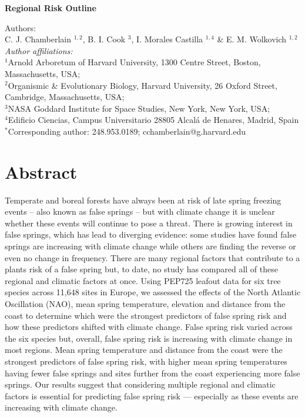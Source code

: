 \documentclass{article}\usepackage[]{graphicx}\usepackage[]{color}
\begin{document}
\noindent \textbf{\Large{Regional Risk Outline}}

\noindent Authors:\\
C. J. Chamberlain $^{1,2}$, B. I. Cook $^{3}$, I. Morales Castilla $^{1,4}$ \& E. M. Wolkovich $^{1,2}$
\vspace{2ex}\\
\emph{Author affiliations:}\\
$^{1}$Arnold Arboretum of Harvard University, 1300 Centre Street, Boston, Massachusetts, USA; \\
$^{2}$Organismic \& Evolutionary Biology, Harvard University, 26 Oxford Street, Cambridge, Massachusetts, USA; \\
$^{3}$NASA Goddard Institute for Space Studies, New York, New York, USA; \\
$^{4}$Edificio Ciencias, Campus Universitario 28805 Alcalá de Henares, Madrid, Spain \\
\vspace{2ex}
$^*$Corresponding author: 248.953.0189; cchamberlain@g.harvard.edu\\

\renewcommand{\thetable}{\arabic{table}}
\renewcommand{\thefigure}{\arabic{figure}}
\renewcommand{\labelitemi}{$-$}


\section*{Abstract}
Temperate and boreal forests have always been at risk of late spring freezing events -- also known as false springs -- but with climate change it is unclear whether these events will continue to pose a threat. There is growing interest in false springs, which has lead to diverging evidence: some studies have found false springs are increasing with climate change while others are finding the reverse or even no change in frequency. There are many regional factors that contribute to a plants risk of a false spring but, to date, no study has compared all of these regional and climatic factors at once. Using PEP725 leafout data for six tree species across 11,648 sites in Europe, we assessed the effects of the North Atlantic Oscillation (NAO), mean spring temperature, elevation and distance from the coast to determine which were the strongest predictors of false spring risk and how these predictors shifted with climate change. False spring risk varied across the six species but, overall, false spring risk is increasing with climate change in most regions. Mean spring temperature and distance from the coast were the strongest predictors of false spring risk, with higher mean spring temperatures having fewer false springs and sites further from the coast experiencing more false springs. Our results suggest that considering multiple regional and climatic factors is essential for predicting false spring risk --- especially as these events are increasing with climate change.
\end{document}
